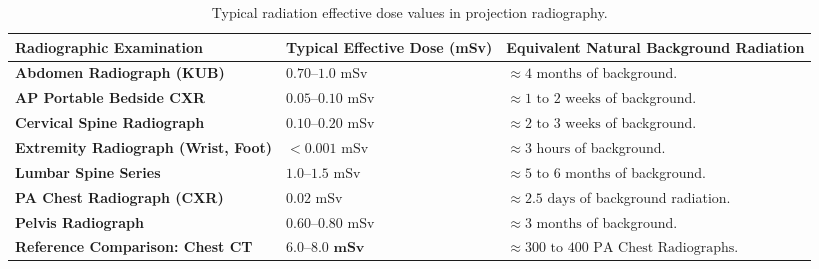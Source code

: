 \documentclass[11pt,a4paper]{article}
\begin{document}
\begin{table}[htbp]
\centering
\small
\renewcommand{\arraystretch}{1.2}
\begin{tabular}{p{5.5cm}p{3cm}p{6.5cm}}
\toprule
\textbf{Radiographic Examination} & \textbf{Typical Effective Dose (mSv)} & \textbf{Equivalent Natural Background Radiation} \\
\midrule
\textbf{Abdomen Radiograph (KUB)} & $0.70\text{--}1.0\text{ mSv}$ & $\approx 4\text{ months}$ of background. \\
\textbf{AP Portable Bedside CXR} & $0.05\text{--}0.10\text{ mSv}$ & $\approx 1\text{ to }2\text{ weeks}$ of background. \\
\textbf{Cervical Spine Radiograph} & $0.10\text{--}0.20\text{ mSv}$ & $\approx 2\text{ to }3\text{ weeks}$ of background. \\
\textbf{Extremity Radiograph (Wrist, Foot)} & $<0.001\text{ mSv}$ & $\approx 3\text{ hours}$ of background. \\
\textbf{Lumbar Spine Series} & $1.0\text{--}1.5\text{ mSv}$ & $\approx 5\text{ to }6\text{ months}$ of background. \\
\textbf{PA Chest Radiograph (CXR)} & $0.02\text{ mSv}$ & $\approx 2.5\text{ days}$ of background radiation. \\
\textbf{Pelvis Radiograph} & $0.60\text{--}0.80\text{ mSv}$ & $\approx 3\text{ months}$ of background. \\
\textbf{Reference Comparison: Chest CT} & $\mathbf{6.0\text{--}8.0\text{ mSv}}$ & $\approx 300\text{ to }400\text{ PA Chest Radiographs}$. \\
\bottomrule
\end{tabular}
\caption{Typical radiation effective dose values in projection radiography.}
\label{tab:dose_comparison}
\end{table}
\end{document}
